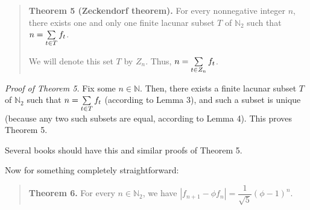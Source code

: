 \documentclass[numbers=enddot,12pt,final,onecolumn,notitlepage]{scrartcl}%
\numberwithin{exer}{section}
\theoremstyle{definition}
\let\sumnonlimits\sum
\renewcommand{\sum}{\sumnonlimits\limits}
\begin{document}
\begin{quote}
\textbf{Theorem 5 (Zeckendorf theorem).} For every nonnegative integer $n$,
there exists one and only one finite lacunar subset $T$ of $\mathbb{N}_{2}$
such that $n=\sum\limits_{t\in T}f_{t}$.

We will denote this set $T$ by $Z_{n}$. Thus, $n=\sum\limits_{t\in Z_{n}}%
f_{t}$.
\end{quote}

\textit{Proof of Theorem 5.} Fix some $n\in\mathbb{N}$. Then, there exists a
finite lacunar subset $T$ of $\mathbb{N}_{2}$ such that $n=\sum\limits_{t\in
T}f_{t}$ (according to Lemma 3), and such a subset is unique (because any two
such subsets are equal, according to Lemma 4). This proves Theorem 5.

Several books should have this and similar proofs of Theorem 5.

Now for something completely straightforward:

\begin{quote}
\textbf{Theorem 6.} For every $n\in\mathbb{N}_{2}$, we have $\left\vert
f_{n+1}-\phi f_{n}\right\vert =\dfrac{1}{\sqrt{5}}\left(  \phi-1\right)  ^{n}$.
\end{quote}
\end{document}
